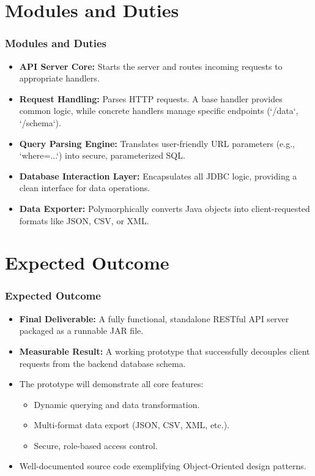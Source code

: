 \documentclass{beamer}
\begin{document}
\section{Modules and Duties}
\begin{frame}
    \frametitle{Modules and Duties}
    \begin{itemize}
        \item \textbf{API Server Core:} Starts the server and routes incoming requests to appropriate handlers.
        \pause
        \item \textbf{Request Handling:} Parses HTTP requests. A base handler provides common logic, while concrete handlers manage specific endpoints (`/data`, `/schema`).
        \pause
        \item \textbf{Query Parsing Engine:} Translates user-friendly URL parameters (e.g., `where=...`) into secure, parameterized SQL.
        \pause
        \item \textbf{Database Interaction Layer:} Encapsulates all JDBC logic, providing a clean interface for data operations.
        \pause
        \item \textbf{Data Exporter:} Polymorphically converts Java objects into client-requested formats like JSON, CSV, or XML.
    \end{itemize}
\end{frame}

\section{Expected Outcome}
\begin{frame}
    \frametitle{Expected Outcome}
    \begin{itemize}
        \item \textbf{Final Deliverable:} A fully functional, standalone RESTful API server packaged as a runnable JAR file.
        \pause
        \item \textbf{Measurable Result:} A working prototype that successfully decouples client requests from the backend database schema.
        \pause
        \item The prototype will demonstrate all core features:
        \begin{itemize}
            \item Dynamic querying and data transformation.
            \item Multi-format data export (JSON, CSV, XML, etc.).
            \item Secure, role-based access control.
        \end{itemize}
        \pause
        \item Well-documented source code exemplifying Object-Oriented design patterns.
    \end{itemize}
\end{frame}
\end{document}
